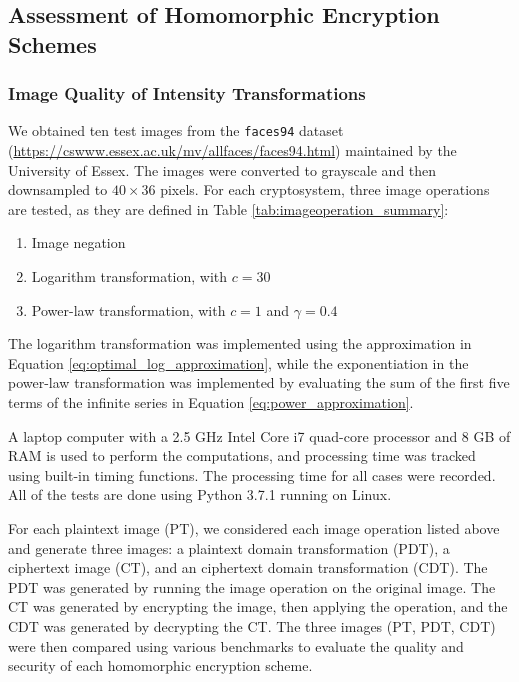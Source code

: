 \subsection{Assessment of Homomorphic Encryption Schemes}
\subsubsection{Image Quality of Intensity Transformations}
We  obtained ten test images from the \texttt{faces94} dataset (\url{https://cswww.essex.ac.uk/mv/allfaces/faces94.html}) maintained by the University of Essex. The images were converted to grayscale and then downsampled to $40 \times 36$ pixels.
For each cryptosystem, three image operations are tested, as they are defined in Table \ref{tab:imageoperation_summary}:
\begin{enumerate}
	\item Image negation
	\item Logarithm transformation, with $c = 30$
	\item Power-law transformation, with $c = 1$ and $\gamma = 0.4$
\end{enumerate}
The logarithm transformation was implemented using the approximation in Equation \ref{eq:optimal_log_approximation}, while the exponentiation in the power-law transformation was implemented by evaluating the sum of the first five terms of the infinite series in Equation \ref{eq:power_approximation}.

A laptop computer with a 2.5 GHz Intel Core i7 quad-core processor and 8 GB of RAM is used to perform the computations, and processing time was tracked using built-in timing functions. The processing time for all cases were recorded. All of the tests are done using Python 3.7.1 running on Linux.

For each plaintext image (PT), we considered each image operation listed above and generate three images: a plaintext domain transformation (PDT), a ciphertext image (CT), and an ciphertext domain transformation (CDT). The PDT was generated by running the image operation on the original image. The CT was generated by encrypting the image, then applying the operation, and the CDT was generated by decrypting the CT. The three images (PT, PDT, CDT) were then compared using various benchmarks to evaluate the quality and security of each homomorphic encryption scheme.


